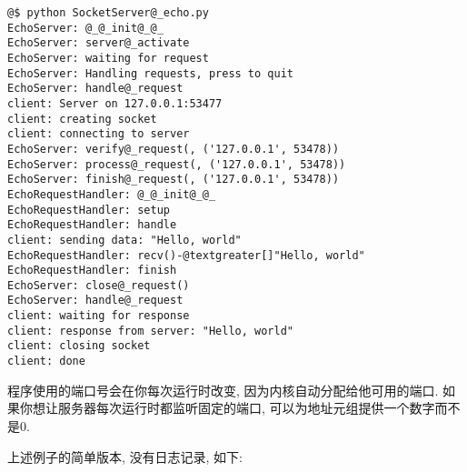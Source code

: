 \documentclass[a4paper,10pt,english]{manual}
\begin{document}
\begin{Verbatim}[commandchars=@\[\]]
@$ python SocketServer@_echo.py
EchoServer: @_@_init@_@_
EchoServer: server@_activate
EchoServer: waiting for request
EchoServer: Handling requests, press to quit
EchoServer: handle@_request
client: Server on 127.0.0.1:53477
client: creating socket
client: connecting to server
EchoServer: verify@_request(, ('127.0.0.1', 53478))
EchoServer: process@_request(, ('127.0.0.1', 53478))
EchoServer: finish@_request(, ('127.0.0.1', 53478))
EchoRequestHandler: @_@_init@_@_
EchoRequestHandler: setup
EchoRequestHandler: handle
client: sending data: "Hello, world"
EchoRequestHandler: recv()-@textgreater[]"Hello, world"
EchoRequestHandler: finish
EchoServer: close@_request()
EchoServer: handle@_request
client: waiting for response
client: response from server: "Hello, world"
client: closing socket
client: done
\end{Verbatim}

程序使用的端口号会在你每次运行时改变, 因为内核自动分配给他可用的端口. 如果你想让服务器每次运行时都监听固定的端口, 可以为地址元组提供一个数字而不是0.

上述例子的简单版本, 没有日志记录, 如下:
\end{document}
